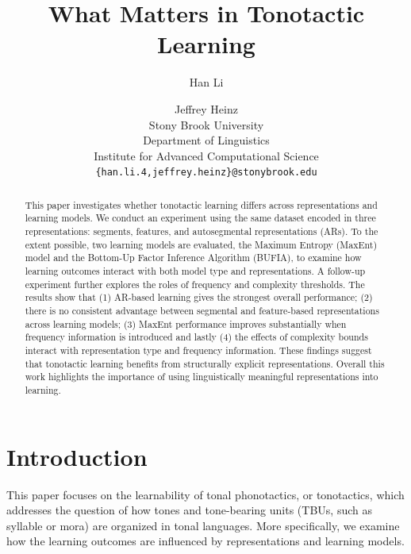\documentclass[11pt]{article}
\title{What Matters in Tonotactic Learning}
\author{Han Li \and Jeffrey Heinz \\
         Stony Brook University \\ 
         Department of Linguistics\\
         Institute for Advanced Computational Science\\
  \texttt{\{han.li.4,jeffrey.heinz\}@stonybrook.edu}}
\begin{document}
\maketitle

\begin{abstract}

This paper investigates whether tonotactic learning differs
across representations and learning models. We conduct an experiment
using the same dataset encoded in three representations:
segments, features, and autosegmental representations (ARs).
To the extent possible, two learning models are evaluated, the Maximum Entropy
(MaxEnt) model and the Bottom-Up Factor Inference Algorithm
(BUFIA), to examine how learning outcomes interact with both
model type and representations. A follow-up experiment
further explores the roles of frequency and complexity
thresholds. The results show that (1) AR-based
learning gives the strongest overall performance;
(2) there is no consistent advantage between
segmental and feature-based representations
across learning models;
(3) MaxEnt performance improves substantially when
frequency information is introduced and lastly (4)
the effects of complexity bounds interact with 
representation type and frequency information.
These findings suggest that tonotactic
learning benefits from structurally explicit
representations. Overall this work highlights
the importance of using linguistically meaningful
representations into learning.

\end{abstract}

\section{Introduction}

This paper focuses on the learnability of tonal phonotactics,
or tonotactics, which addresses the question of how tones
and tone-bearing units (TBUs, such as syllable or mora) are
organized in tonal languages. More specifically, we examine
how the learning outcomes are influenced by representations
and learning models.
\end{document}
